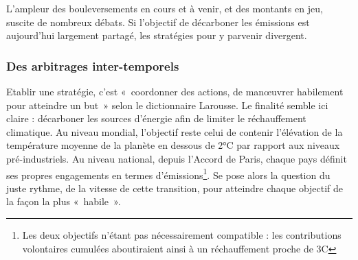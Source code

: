 L’ampleur des bouleversements en cours et à venir, et des montants en jeu, suscite de nombreux débats. Si l’objectif de décarboner les émissions est aujourd’hui largement partagé, les stratégies pour y parvenir divergent. 

\subsubsection{Des arbitrages inter-temporels}
Etablir une stratégie, c’est «~coordonner des actions, de manœuvrer habilement pour atteindre un but~» selon le dictionnaire Larousse. Le finalité semble ici claire : décarboner les sources d’énergie afin de limiter le réchauffement climatique. Au niveau mondial, l’objectif reste celui de contenir l’élévation de la température moyenne de la planète en dessous de 2°C par rapport aux niveaux pré-industriels. Au niveau national, depuis l’Accord de Paris, chaque pays définit ses propres engagements en termes d’émissions\footnote{Les deux objectifs n’étant pas nécessairement compatible : les contributions volontaires cumulées aboutiraient ainsi à un réchauffement proche de 3\degree C}. Se pose alors la question du juste rythme, de la vitesse de cette transition, pour atteindre chaque objectif de la façon la plus «~habile~».

